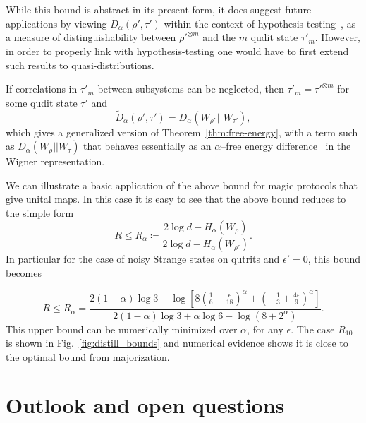 \documentclass[pra,
aps,
twocolumn,
superscriptaddress,
groupedaddress,
nofootinbib,
reprint
]{revtex4-1}
\begin{document}
While this bound is abstract in its present form, it does suggest future applications by viewing $\widetilde{D}_\alpha( \rho', \tau')$ within the context of hypothesis testing~\cite{tomamichel2013}, as a measure of distinguishability between $\rho'^{\otimes m}$ and the $m$ qudit state $\tau'_m$. 
However, in order to properly link with hypothesis-testing one would have to first extend such results to quasi-distributions.

If correlations in $\tau'_m$ between subsystems can be neglected, then $\tau'_m = \tau'^{\otimes m}$ for some qudit state $\tau'$ and
\begin{equation}
	\widetilde{D}_\alpha( \rho', \tau') = D_\alpha (W_{\rho'} \hspace{1pt}||\hspace{1pt} W_{\tau'}),
\end{equation}
which gives a generalized version of Theorem~\ref{thm:free-energy}, with a term such as $D_\alpha(W_\rho ||W_\tau)$ that behaves essentially as an $\alpha$--free energy difference~\cite{Brandao_2015} in the Wigner representation.

We can illustrate a basic application of the above bound for magic protocols that give unital maps. In this case it is easy to see that the above bound reduces to the simple form
\begin{equation}
	R \leq R_\alpha \coloneqq \frac{2\log d - H_{\alpha}(W_\rho)}{2\log d - H_{\alpha}(W_{\rho'})}.
\end{equation}
In particular for the case of noisy Strange states on qutrits and $\epsilon'=0$, this bound becomes

\begin{equation}
	R \leq R_\alpha = \frac{2(1-\alpha)\log 3 - \log \left [8(\frac{1}{6} - \frac{\epsilon}{18})^\alpha + (-\frac{1}{3} + \frac{4\epsilon}{9})^\alpha\right ] }{2(1-\alpha)\log 3 + \alpha \log 6 - \log (8 + 2^\alpha )}.
\end{equation}
This upper bound can be numerically minimized over $\alpha$, for any $\epsilon$. The case $R_{10}$ is shown in Fig.~\ref{fig:distill_bounds} and numerical evidence shows it is close to the optimal bound from majorization.

\section{Outlook and open questions}
\label{sec:lower_bounds}
\end{document}
